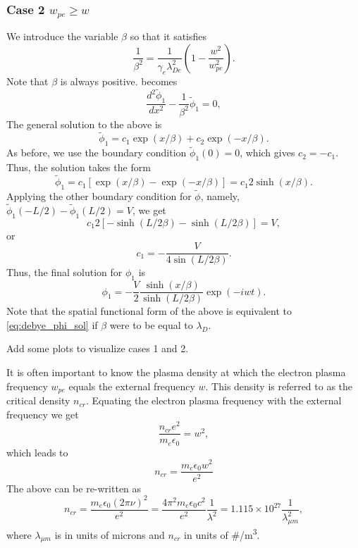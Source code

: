 \documentclass[a4paper,11pt]{report}
\begin{document}
\subsubsection{Case 2 $w_{pe} \ge w$}
We introduce the variable $\beta$ so that it satisfies
\begin{equation}
    \frac{1}{\beta^2} = \frac{1}{\gamma_e \lambda^2_{De}} \left( 1 - \frac{w^2}{w^2_{pe}} \right).
\end{equation}
Note that $\beta$ is always positive.  becomes 
\begin{equation}
    \frac{d^2 \tilde{\phi}_1}{dx^2} - \frac{1}{\beta^2} \tilde{\phi}_1 = 0,
\end{equation}
The general solution to the above is
\begin{equation*}
    \tilde{\phi}_1 = c_1 \exp (x / \beta) + c_2 \exp (-x / \beta).
\end{equation*}
As before, we use the boundary condition $\tilde{\phi}_1(0) = 0$, which gives $c_2 = -c_1$. Thus, the solution takes the form
\begin{equation*}
    \tilde{\phi}_1 = c_1 \left[ \exp (x / \beta) - \exp (-x / \beta) \right] = c_1 2 \sinh (x / \beta).
\end{equation*}
Applying the other boundary condition for $\tilde{\phi}$, namely, $\tilde{\phi}_1(-L/2) - \tilde{\phi}_1(L/2) = V$, we get
\begin{equation*}
    c_1 2 \left[ -\sinh \left( L / 2 \beta \right) - \sinh \left( L / 2 \beta \right) \right] = V,
\end{equation*}
or
\begin{equation*}
    c_1 = - \frac{V}{4 \sin \left( L / 2 \beta \right)}.
\end{equation*}
Thus, the final solution for $\phi_1$ is
\begin{equation}
    \phi_1 = - \frac{V}{2} \frac{\sinh (x / \beta)}{\sinh (L / 2 \beta)} \exp(-iwt).
\end{equation}
Note that the spatial functional form of the above is equivalent to \cref{eq:debye_phi_sol} if $\beta$ were to be equal to $\lambda_D$.

Add some plots to visualize cases 1 and 2.

It is often important to know the plasma density at which the electron plasma frequency $w_{pe}$ equals the external frequency $w$. This density is referred to as the critical density $n_{cr}$. Equating the electron plasma frequency with the external frequency we get
\begin{equation*}
    \frac{n_{cr} e^2}{m_e \epsilon_0} = w^2,
\end{equation*}
which leads to
\begin{equation}
    \label{eq:plas_freq_crit_den}
    n_{cr} = \frac{m_e \epsilon_0 w^2}{e^2}
\end{equation}
The above can be re-written as
\begin{equation*}
    n_{cr} = \frac{m_e \epsilon_0 (2 \pi \nu)^2}{e^2} = \frac{4 \pi^2 m_e \epsilon_0 c^2}{e^2} \frac{1}{\lambda^2} = 1.115 \times 10^{27} \frac{1}{\lambda_{\mu m}^2},
\end{equation*}
where $\lambda_{\mu m}$ is in units of microns and $n_{cr}$ in units of \#/m\textsuperscript{3}.
\end{document}
